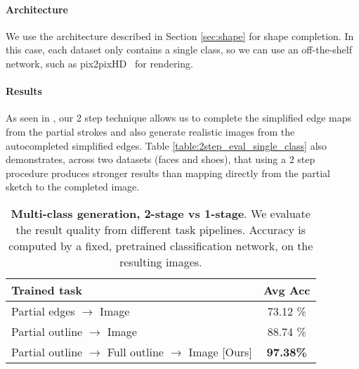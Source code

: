 \paragraph{Architecture} We use the architecture described in Section \ref{sec:shape} for shape completion. In this case, each dataset only contains a single class, so we can use an off-the-shelf network, such as pix2pixHD~\cite{wang2017high} for rendering.

\paragraph{Results} As seen in , our 2 step technique allows us to complete the simplified edge maps from the partial strokes and also generate realistic images from the autocompleted simplified edges.
Table \ref{table:2step_eval_single_class} also demonstrates, across two datasets (faces and shoes), that using a 2 step procedure produces stronger results than mapping directly from the partial sketch to the completed image.

\begin{table}[t]
	\centering
	\begin{tabular}{l c}
		\toprule
		\textbf{Trained task} & \textbf{Avg Acc} \\ \midrule
		Partial edges $\rightarrow$ Image & 73.12 \% \\
		Partial outline $\rightarrow$ Image & 88.74 \% \\
		Partial outline $\rightarrow$ Full outline $\rightarrow$ Image [Ours] & \textbf{97.38\%}  \\
		\bottomrule %
	\end{tabular}
	\vspace{-2mm}
	\caption{\label{table:2step_eval} \textbf{Multi-class generation, 2-stage vs 1-stage}. We evaluate the result quality from different task pipelines. Accuracy is computed by a fixed, pretrained classification network, on the resulting images.
		\vspace{-1mm}
	}
\end{table}




